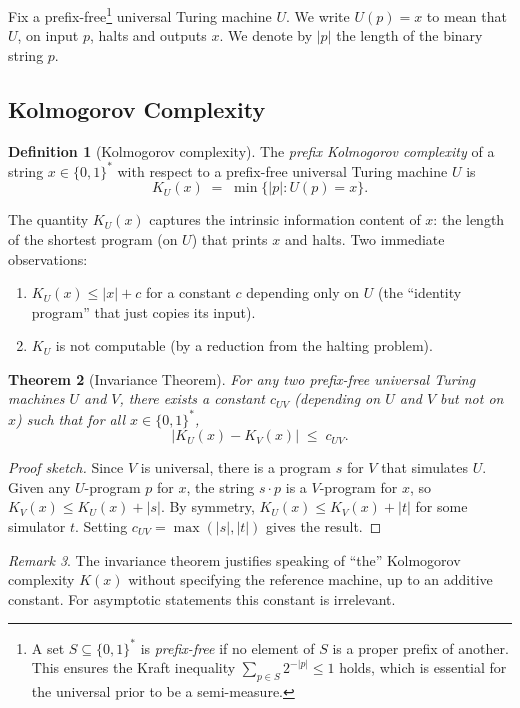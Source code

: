 \documentclass[11pt,a4paper]{article}
\newtheorem{theorem}{Theorem}[section]
\theoremstyle{definition}
\newtheorem{definition}[theorem]{Definition}
\theoremstyle{remark}
\newtheorem{remark}[theorem]{Remark}
\newcommand{\KU}{K_U}
\newcommand{\Bstar}{\{0,1\}^*}
\begin{document}
Fix a prefix-free\footnote{A set $S\subseteq\Bstar$ is \emph{prefix-free} if
no element of $S$ is a proper prefix of another.  This ensures the Kraft
inequality $\sum_{p\in S}2^{-|p|}\le 1$ holds, which is essential for the
universal prior to be a semi-measure.} universal Turing machine $U$.
We write $U(p)=x$ to mean that $U$, on input $p$, halts and outputs $x$.
We denote by $|p|$ the length of the binary string $p$.

\subsection{Kolmogorov Complexity}

\begin{definition}[Kolmogorov complexity]\label{def:kolmogorov}
The \emph{prefix Kolmogorov complexity} of a string $x\in\Bstar$ with respect
to a prefix-free universal Turing machine $U$ is
\[
  \KU(x) \;=\; \min\bigl\{|p| : U(p) = x\bigr\}.
\]
\end{definition}

The quantity $\KU(x)$ captures the intrinsic information content of $x$: the
length of the shortest program (on $U$) that prints $x$ and halts.
Two immediate observations:
\begin{enumerate}[nosep]
\item $\KU(x)\le |x|+c$ for a constant $c$ depending only on $U$
      (the ``identity program'' that just copies its input).
\item $\KU$ is not computable (by a reduction from the halting problem).
\end{enumerate}

\begin{theorem}[Invariance Theorem]\label{thm:invariance}
For any two prefix-free universal Turing machines $U$ and $V$, there exists a
constant $c_{UV}$ (depending on $U$ and $V$ but not on $x$) such that for all
$x\in\Bstar$,
\[
  \bigl|K_U(x) - K_V(x)\bigr| \;\le\; c_{UV}.
\]
\end{theorem}

\begin{proof}[Proof sketch]
Since $V$ is universal, there is a program $s$ for $V$ that simulates $U$.
Given any $U$-program $p$ for $x$, the string $s\cdot p$ is a $V$-program
for $x$, so $K_V(x)\le K_U(x)+|s|$.  By symmetry, $K_U(x)\le K_V(x)+|t|$
for some simulator $t$.  Setting $c_{UV}=\max(|s|,|t|)$ gives the result.
\end{proof}

\begin{remark}
The invariance theorem justifies speaking of ``the'' Kolmogorov complexity
$K(x)$ without specifying the reference machine, up to an additive constant.
For asymptotic statements this constant is irrelevant.
\end{remark}
\end{document}
